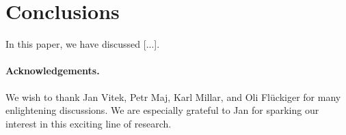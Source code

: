\section{Conclusions}
\label{se:conclusions}

In this paper, we have discussed [...].

\ifx\noauthorea\undefined
\paragraph{Acknowledgements.}

We wish to thank Jan Vitek, Petr Maj, Karl Millar, and Oli Fl{\"u}ckiger for many enlightening discussions. We are especially grateful to Jan for sparking our interest in this exciting line of research. %
\fi
